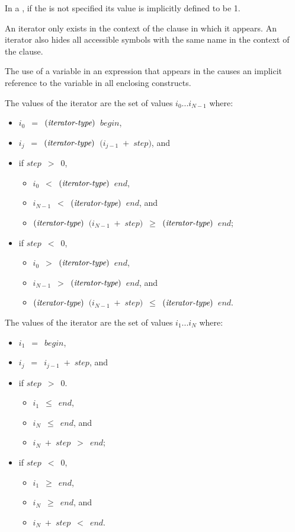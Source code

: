 In a , if the  is not specified its value is
implicitly defined to be 1.

An iterator only exists in the context of the clause in which it appears. An
iterator also hides all accessible symbols with the same name in the context of
the clause.

The use of a variable in an expression that appears in the
 causes an implicit reference to the variable in all
enclosing constructs.

\begin{ccppspecific}
The values of the iterator are the set of values $i_{0}$...$i_{N-1}$ where:
\begin{itemize}
\item $i_{0}$~$=$~$(\plc{iterator-type})$~$begin$, 
\item $i_{j}$~$=$~$(\plc{iterator-type})$~$(i_{j-1}$~$+$~$step)$, and
\item  if $step$~$>$~$0$,
\begin{itemize}
\item $i_{0}$~$<$~$(\plc{iterator-type})$~$end$,
\item $i_{N-1}$~$<$~$(\plc{iterator-type})$~$end$, and 
\item $(\plc{iterator-type})$~$(i_{N-1}$~$+$~$step)$~$\geq$~$(\plc{iterator-type})$~$end$;
\end{itemize}
\item if $step$~$<$~$0$,
\begin{itemize}
\item $i_{0}$~$>$~$(\plc{iterator-type})$~$end$,
\item $i_{N-1}$~$>$~$(\plc{iterator-type})$~$end$, and 
\item $(\plc{iterator-type})$~$(i_{N-1}$~$+$~$step)$~$\leq$~$(\plc{iterator-type})$~$end$.
\end{itemize}
\end{itemize}
\end{ccppspecific}

\begin{fortranspecific}
The values of the iterator are the set of values $i_{1}$...$i_{N}$ where:
\begin{itemize}
\item $i_{1}$~$=$~$begin$,  
\item $i_{j}$~$=$~$i_{j-1}$~$+$~$step$, and
\item if $step$~$>$~$0$.
\begin{itemize}
\item $i_{1}$~$\leq$~$end$,
\item $i_{N}$~$\leq$~$end$, and 
\item $i_{N}$~$+$~$step$~$>$~$end$;
\end{itemize}
\item if $step$~$<$~$0$,
\begin{itemize}
\item $i_{1}$~$\geq$~$end$,
\item $i_{N}$~$\geq$~$end$, and 
\item $i_{N}$~$+$~$step$~$<$~$end$.
\end{itemize}
\end{itemize}
\end{fortranspecific}

